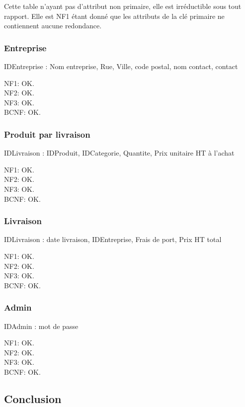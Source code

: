 \documentclass[a4paper, 12pt]{report}
\begin{document}
\begin{spacing}{1.2}
Cette table n'ayant pas d'attribut non primaire, elle est irréductible sous tout rapport. Elle est NF1 étant donné que les attributs de la clé primaire ne contiennent aucune redondance.

\textcolor{colortitre3}{\subsubsection*{Entreprise}}

IDEntreprise : Nom entreprise, Rue, Ville, code postal, nom contact, contact

NF1: OK.\\
NF2: OK.\\
NF3: OK.\\
BCNF: OK.\\

\textcolor{colortitre3}{\subsubsection*{Produit par livraison}}

IDLivraison : IDProduit, IDCategorie, Quantite, Prix unitaire HT à l'achat

NF1: OK.\\
NF2: OK.\\
NF3: OK.\\
BCNF: OK.\\

\textcolor{colortitre3}{\subsubsection*{Livraison}}

IDLivraison : date livraison, IDEntreprise, Frais de port, Prix HT total

NF1: OK.\\
NF2: OK.\\
NF3: OK.\\
BCNF: OK.\\

\textcolor{colortitre3}{\subsubsection*{Admin}}

IDAdmin : mot de passe

NF1: OK.\\
NF2: OK.\\
NF3: OK.\\
BCNF: OK.\\

\newpage
\textcolor{colortitre1}{\section*{Conclusion}} 



\end{spacing}
\end{document}
